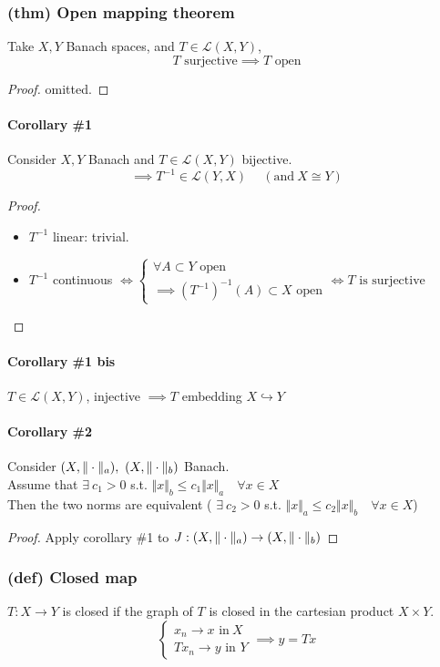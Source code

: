 \subsubsection{(thm) Open mapping theorem}
Take $X,Y$ Banach spaces, and $T\in \mathcal L(X,Y)$,
$$T\text{ surjective}\implies T\text{ open}$$
\begin{proof}
    omitted.
\end{proof}
\paragraph{Corollary \#1}
Consider $X,Y$ Banach and $T\in \mathcal L(X,Y)$ bijective.
$$\implies T^{-1}\in \mathcal L(Y,X)\quad \ (\text{and} \ X\cong Y)$$
\begin{proof}\ 
    \begin{itemize}
        \item $T^{-1}$ linear: trivial.
        \item $T^{-1}$ continuous $\iff \begin{cases}
            \forall A\subset Y \text{ open}\\\implies (T^{-1})^{-1}(A)\subset X\text{ open}
        \end{cases}\iff T\text{ is surjective}$
    \end{itemize}
\end{proof}
\paragraph{Corollary \#1 bis}
$T\in \mathcal L(X,Y)$, injective $\implies T$ embedding $X\hookrightarrow Y$
\paragraph{Corollary \#2}
Consider $(X,\cnorm_a),\ (X,\cnorm_b)$ Banach.\\
Assume that $\exists\ c_1>0$ s.t. $\Vert x\Vert_b\leq c_1\Vert x\Vert_a\quad \forall x\in X$
\\
Then the two norms are equivalent (
$\exists\ c_2>0$ s.t. $\Vert x\Vert_a\leq c_2\Vert x\Vert_b\quad \forall x\in X$)
\begin{proof}
    Apply corollary \#1 to $J:(X,\Vert \cdot \Vert_a)\to( X,\Vert \cdot \Vert_b)$
\end{proof}
\subsubsection{(def) Closed map}
$T:X\to Y$ is closed if the graph of $T$ is closed in the cartesian product $X\times Y$.
$$\begin{cases}
    x_n\to x\text{ in}\ X\\ Tx_n\to y\text{ in }Y
\end{cases}\implies y=Tx$$

